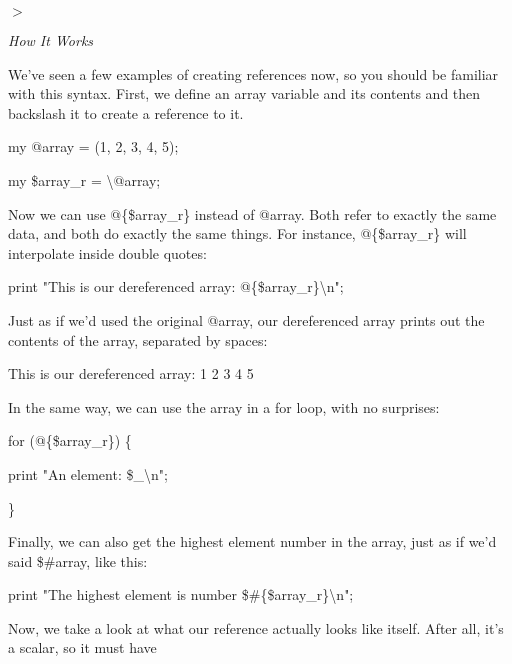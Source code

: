 \documentclass[a4paper,11pt]{book}
\begin{document}
\noindent $>$

\noindent 

\noindent 

\noindent \textit{How It Works}

\noindent We've seen a few examples of creating references now, so you should be familiar with this syntax. First, we define an array variable and its contents and then backslash it to create a reference to it.

\noindent 

\noindent my @array = (1, 2, 3, 4, 5);

\noindent my \$array\_r = \textbackslash @array;

\noindent 

\noindent Now we can use @\{\$array\_r\} instead of @array. Both refer to exactly the same data, and both do exactly the same things. For instance, @\{\$array\_r\} will interpolate inside double quotes:

\noindent 

\noindent print "This is our dereferenced array: @\{\$array\_r\}\textbackslash n";

\noindent 

\noindent Just as if we'd used the original @array, our dereferenced array prints out the contents of the array, separated by spaces:

\noindent 

\noindent This is our dereferenced array: 1 2 3 4 5

\noindent 

\noindent In the same way, we can use the array in a for loop, with no surprises:

\noindent 

\noindent for (@\{\$array\_r\}) \{

\noindent print "An element: \$\_\textbackslash n";

\noindent \}

\noindent 

\noindent Finally, we can also get the highest element number in the array, just as if we'd said \$\#array, like this:

\noindent 

\noindent print "The highest element is number \$\#\{\$array\_r\}\textbackslash n";

\noindent 

\noindent Now, we take a look at what our reference actually looks like itself. After all, it's a scalar, so it must have
\end{document}

